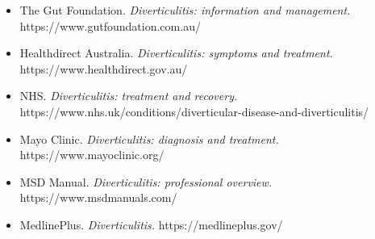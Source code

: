 \begin{itemize}
    \item The Gut Foundation. \textit{Diverticulitis: information and management.} https://www.gutfoundation.com.au/
    \item Healthdirect Australia. \textit{Diverticulitis: symptoms and treatment.} https://www.healthdirect.gov.au/
    \item NHS. \textit{Diverticulitis: treatment and recovery.} https://www.nhs.uk/conditions/diverticular-disease-and-diverticulitis/
    \item Mayo Clinic. \textit{Diverticulitis: diagnosis and treatment.} https://www.mayoclinic.org/
    \item MSD Manual. \textit{Diverticulitis: professional overview.} https://www.msdmanuals.com/
    \item MedlinePlus. \textit{Diverticulitis.} https://medlineplus.gov/
\end{itemize}
